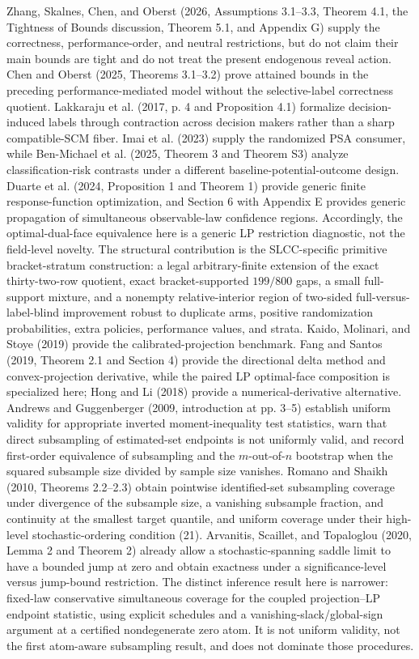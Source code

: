 \documentclass{article}
\begin{document}
Zhang, Skalnes, Chen, and Oberst (2026, Assumptions 3.1--3.3, Theorem 4.1, the Tightness of Bounds discussion, Theorem 5.1, and Appendix G) supply the correctness, performance-order, and neutral restrictions, but do not claim their main bounds are tight and do not treat the present endogenous reveal action. Chen and Oberst (2025, Theorems 3.1--3.2) prove attained bounds in the preceding performance-mediated model without the selective-label correctness quotient. Lakkaraju et al. (2017, p. 4 and Proposition 4.1) formalize decision-induced labels through contraction across decision makers rather than a sharp compatible-SCM fiber. Imai et al. (2023) supply the randomized PSA consumer, while Ben-Michael et al. (2025, Theorem 3 and Theorem S3) analyze classification-risk contrasts under a different baseline-potential-outcome design. Duarte et al. (2024, Proposition 1 and Theorem 1) provide generic finite response-function optimization, and Section 6 with Appendix E provides generic propagation of simultaneous observable-law confidence regions. Accordingly, the optimal-dual-face equivalence here is a generic LP restriction diagnostic, not the field-level novelty. The structural contribution is the SLCC-specific primitive bracket-stratum construction: a legal arbitrary-finite extension of the exact thirty-two-row quotient, exact bracket-supported \(199/800\) gaps, a small full-support mixture, and a nonempty relative-interior region of two-sided full-versus-label-blind improvement robust to duplicate arms, positive randomization probabilities, extra policies, performance values, and strata. Kaido, Molinari, and Stoye (2019) provide the calibrated-projection benchmark. Fang and Santos (2019, Theorem 2.1 and Section 4) provide the directional delta method and convex-projection derivative, while the paired LP optimal-face composition is specialized here; Hong and Li (2018) provide a numerical-derivative alternative. Andrews and Guggenberger (2009, introduction at pp. 3--5) establish uniform validity for appropriate inverted moment-inequality test statistics, warn that direct subsampling of estimated-set endpoints is not uniformly valid, and record first-order equivalence of subsampling and the \(m\)-out-of-\(n\) bootstrap when the squared subsample size divided by sample size vanishes. Romano and Shaikh (2010, Theorems 2.2--2.3) obtain pointwise identified-set subsampling coverage under divergence of the subsample size, a vanishing subsample fraction, and continuity at the smallest target quantile, and uniform coverage under their high-level stochastic-ordering condition (21). Arvanitis, Scaillet, and Topaloglou (2020, Lemma 2 and Theorem 2) already allow a stochastic-spanning saddle limit to have a bounded jump at zero and obtain exactness under a significance-level versus jump-bound restriction. The distinct inference result here is narrower: fixed-law conservative simultaneous coverage for the coupled projection--LP endpoint statistic, using explicit schedules and a vanishing-slack/global-sign argument at a certified nondegenerate zero atom. It is not uniform validity, not the first atom-aware subsampling result, and does not dominate those procedures.
\end{document}
